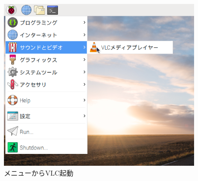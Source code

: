 \begin{figure}[hb]
  \centering
  \begin{minipage}{10.917cm}
    {\upshape
      \includegraphics[height=8.715cm]{text01-img/textbook-img113.png}
      \caption{メニューからVLC起動}
    }
  \end{minipage}
\end{figure}
\clearpage

